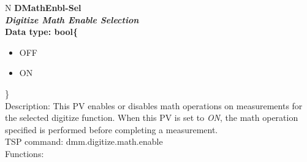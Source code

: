 \documentclass[openany]{article}
\begin{document}
		\begin{tabular}{N}
			\hline
			\bfseries DMathEnbl-Sel\label{pv:dmathenbl-sel} \\ \hline
			\emph{Digitize Math Enable Selection} \\
			Data type: bool\{\begin{itemize}[noitemsep]
				\small
				\item[] OFF
				\item[] ON
			\end{itemize}\} \\
			Description: This PV enables or disables math operations on measurements for the selected digitize function. When this PV is set to \emph{ON}, the math operation specified is performed before completing a measurement. \\
			TSP command: dmm.digitize.math.enable \\
			Functions: \\
			\arrayrulecolor{\FuncTableBorderColor}

		\end{tabular}
\end{document}
